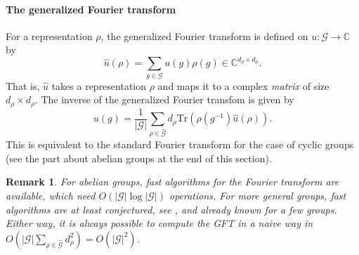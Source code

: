 \documentclass[preprint,12pt,authoryear]{elsarticle}
\newcommand{\C}{\mathbb{C}}
\newcommand{\Fourier}[1]{\widehat{#1}}
\newcommand\Gc{\mathcal G}
\newtheorem{remark}{Remark}%
\begin{document}
{\paragraph{The generalized Fourier transform}
For a representation $\rho$, the generalized Fourier transform is defined on $u : \Gc \rightarrow \C$ by
\begin{equation}
    \Fourier{ u }(\rho) = \sum_{g \in \Gc} u(g) \rho(g) \in \C^{d_\rho \times d_\rho}.
    \label{eq:generalized-fourier-transform}
\end{equation}
That is, $\Fourier{u}$ takes a representation $\rho$ and maps it to a complex \emph{matrix} of size $d_\rho \times d_\rho$. The inverse of the generalized Fourier transfom is given by 
\begin{equation}
    u(g) = \frac{1}{|\Gc|} \sum_{\rho \in \Fourier{\Gc}} d_\rho \mathrm{Tr}(\rho(g^{-1}) \Fourier{u}(\rho)).
    \label{eq:generalized-inv-fourier-transform}
\end{equation}
This is equivalent to the standard Fourier transform for the case of cyclic groups (see the part about abelian groups at the end of this section).

\begin{remark}
    For abelian groups, fast algorithms for the Fourier transform are available, which need $O(|\Gc| \log |\Gc|)$ operations. For more general groups, fast algorithms are at least conjectured, see \cite{maslen2001cooley}, and already known for a few groups. Either way, it is always possible to compute the GFT in a naive way in $O(|\Gc| \sum_{\rho \in \Fourier{\Gc}} d_\rho^2 ) = O(|\Gc|^2)$.
\end{remark}


}
\end{document}
